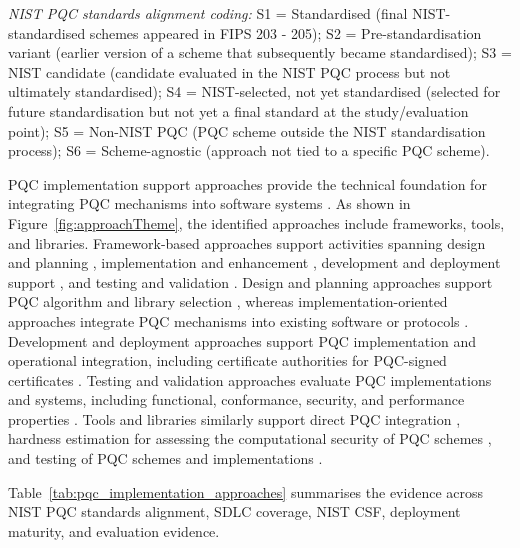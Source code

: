 \documentclass[letterpaper,twocolumn,10pt]{article}
\begin{document}
\begin{table}[ht]
\begin{tablenotes}
\item \textit{NIST PQC standards alignment coding:}
S1 = Standardised (final NIST-standardised schemes appeared in FIPS 203 - 205);
S2 = Pre-standardisation variant (earlier version of a scheme that subsequently became standardised);
S3 = NIST candidate (candidate evaluated in the NIST PQC process but not ultimately standardised); 
S4 = NIST-selected, not yet standardised (selected for future standardisation but not yet a final standard at the study/evaluation point); 
S5 = Non-NIST PQC (PQC scheme outside the NIST standardisation process); 
S6 = Scheme-agnostic (approach not tied to a specific PQC scheme). 

\end{tablenotes}

\end{table}

PQC implementation support approaches provide the technical foundation for integrating PQC mechanisms into software systems \cite{anonymous_pqc_sok_2026}. As shown in Figure~\ref{fig:approachTheme}, the identified approaches include frameworks, tools, and libraries. Framework-based approaches support activities spanning design and planning \cite{Ana_decisionAlgo}, implementation and enhancement \cite{Ana_huelsing2021wireguard}, development and deployment support \cite{Ana_ojha2025adoption, Ana_tsili_scalable_2025}, and testing and validation \cite{Ana_kannwischer_improving_2022, Ana_e27020212}. Design and planning approaches support PQC algorithm and library selection \cite{Ana_decisionAlgo}, whereas implementation-oriented approaches integrate PQC mechanisms into existing software or protocols \cite{Ana_huelsing2021wireguard}. Development and deployment approaches support PQC implementation and operational integration, including certificate authorities for PQC-signed certificates \cite{Ana_ojha2025adoption, Ana_tsili_scalable_2025}. Testing and validation approaches evaluate PQC implementations and systems, including functional, conformance, security, and performance properties \cite{Ana_kannwischer_improving_2022, Ana_e27020212}. Tools and libraries similarly support direct PQC integration \cite{Ana_hekkala_implementing_2023, Ana_saucedo-estrada_post-quantum_2020}, hardness estimation for assessing the computational security of PQC schemes \cite{Ana_esser_sok_2024}, and testing of PQC schemes and implementations \cite{Ana_kannwischer_improving_2022, Ana_PQCLeo25}. 

Table~\ref{tab:pqc_implementation_approaches} summarises the evidence across NIST PQC standards alignment, SDLC coverage, NIST CSF, deployment maturity, and evaluation evidence.
\end{document}
